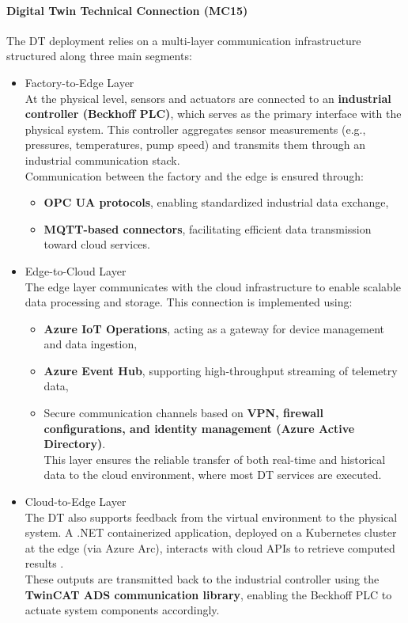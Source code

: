 \documentclass[
]{article}
\providecommand{\tightlist}{%
  \setlength{\itemsep}{0pt}\setlength{\parskip}{0pt}}
\begin{document}
\paragraph{Digital Twin Technical Connection
(MC15)}\label{digital-twin-technical-connection-mc15}

The DT deployment relies on a multi-layer communication infrastructure
structured along three main segments:

\begin{itemize}
\tightlist
\item
  Factory-to-Edge Layer\\
  At the physical level, sensors and actuators are connected to an
  \textbf{industrial controller (Beckhoff PLC)}, which serves as the
  primary interface with the physical system. This controller aggregates
  sensor measurements (e.g., pressures, temperatures, pump speed) and
  transmits them through an industrial communication stack.\\
  Communication between the factory and the edge is ensured through:

  \begin{itemize}
  \tightlist
  \item
    \textbf{OPC UA protocols}, enabling standardized industrial data
    exchange,
  \item
    \textbf{MQTT-based connectors}, facilitating efficient data
    transmission toward cloud services.
  \end{itemize}
\item
  Edge-to-Cloud Layer\\
  The edge layer communicates with the cloud infrastructure to enable
  scalable data processing and storage. This connection is implemented
  using:

  \begin{itemize}
  \tightlist
  \item
    \textbf{Azure IoT Operations}, acting as a gateway for device
    management and data ingestion,
  \item
    \textbf{Azure Event Hub}, supporting high-throughput streaming of
    telemetry data,
  \item
    Secure communication channels based on \textbf{VPN, firewall
    configurations, and identity management (Azure Active Directory)}.\\
    This layer ensures the reliable transfer of both real-time and
    historical data to the cloud environment, where most DT services are
    executed.
  \end{itemize}
\item
  Cloud-to-Edge Layer\\
  The DT also supports feedback from the virtual environment to the
  physical system. A .NET containerized application, deployed on a
  Kubernetes cluster at the edge (via Azure Arc), interacts with cloud
  APIs to retrieve computed results .\\
  These outputs are transmitted back to the industrial controller using
  the \textbf{TwinCAT ADS communication library}, enabling the Beckhoff
  PLC to actuate system components accordingly.
\end{itemize}
\end{document}
